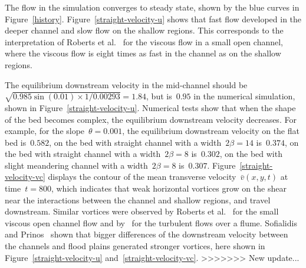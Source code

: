 \documentclass[twocolumn]{afmc_art}
\newcommand{\vv}{{\bar v}}
\begin{document}
The flow in the simulation converges to steady state, shown by the blue curves in Figure~\ref{history}.
Figure~\ref{straight-velocity-u} shows that fast flow developed in the deeper channel and slow flow on the shallow regions.
This corresponds to the interpretation of Roberts et al.~\cite{Robertsli2006} for the viscous flow in a small open channel, where the viscous flow is eight times as fast in the channel as on the shallow regions. 

The equilibrium downstream velocity in the mid-channel should be $\sqrt{0.985\sin(0.01)\times1/0.00293}=1.84$, but is~$0.95$ in the numerical simulation, shown in Figure~\ref{straight-velocity-u}. 
Numerical tests show that when the shape of the bed becomes complex, the equilibrium downstream velocity decreases. 
For example, for the slope~$\theta=0.001$, the equilibrium downstream velocity on the flat bed is~$0.582$, on the bed with straight channel with a width~$2\beta=14$ is~$0.374$, on the bed with straight channel with a width~$2\beta=8$ is~$0.302$, on the bed with slight meandering channel with a width~$2\beta=8$ is~$0.307$.
Figure~\ref{straight-velocity-vc} displays the contour of the mean transverse velocity~$\vv(x,y,t)$ at time~$t=800$, which indicates that weak horizontal vortices grow on the shear near the interactions between the channel and shallow regions, and travel downstream. 
Similar vortices were observed by Roberts et al.~\cite{Robertsli2006} for the small viscous open channel flow and by~\cite{Bousmar2003a} for the turbulent flows over a flume. Sofialidis and Prinos~\cite{Sofialidis:1999fk} shown that bigger differences of the downstream velocity between the channels and flood plains generated stronger vortices, here shown in Figure~\ref{straight-velocity-u} and~\ref{straight-velocity-vc}.
>>>>>>> New update...
\end{document}
